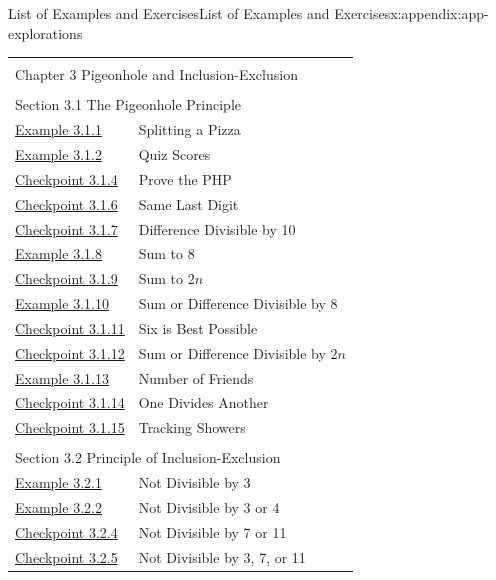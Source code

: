 \documentclass[oneside,10pt,]{book}
\numberwithin{equation}{section}
\begin{document}
\begin{appendixptx}{List of Examples and Exercises}{}{List of Examples and Exercises}{}{}{x:appendix:app-explorations}
\begin{longtable}[l]{ll}
\multicolumn{2}{l}{\null}\\[1.5ex] \multicolumn{2}{l}{\large Chapter 3 Pigeonhole and Inclusion-Exclusion}\\[0.5ex]
\multicolumn{2}{l}{\null}\\[1.5ex] \multicolumn{2}{l}{\large Section 3.1 The Pigeonhole Principle}\\[0.5ex]
\hyperref[x:example:eg-php-pizza]{Example 3.1.1}& Splitting a Pizza\\
\hyperref[x:example:eg-php-quiz-scores]{Example 3.1.2}& Quiz Scores\\
\hyperref[x:exercise:ex-php-proof]{Checkpoint 3.1.4}& Prove the PHP\\
\hyperref[x:exercise:ex-php-last-digit]{Checkpoint 3.1.6}& Same Last Digit\\
\hyperref[x:exercise:ex-php-difference-divisible]{Checkpoint 3.1.7}& Difference Divisible by 10\\
\hyperref[x:example:eg-php-sum-to-8]{Example 3.1.8}& Sum to 8\\
\hyperref[x:exercise:ex-php-sum-to-2n]{Checkpoint 3.1.9}& Sum to \(2n\)\\
\hyperref[x:example:eg-php-sum-diff-8]{Example 3.1.10}& Sum or Difference Divisible by 8\\
\hyperref[x:exercise:ex-php-sum-diff-8-best]{Checkpoint 3.1.11}& Six is Best Possible\\
\hyperref[x:exercise:ex-php-sum-diff-2n]{Checkpoint 3.1.12}& Sum or Difference Divisible by \(2n\)\\
\hyperref[x:example:ex-php-friends]{Example 3.1.13}& Number of Friends\\
\hyperref[x:exercise:ex-php-divides]{Checkpoint 3.1.14}& One Divides Another\\
\hyperref[x:exercise:ex-php-shower]{Checkpoint 3.1.15}& Tracking Showers\\
\multicolumn{2}{l}{\null}\\[1.5ex] \multicolumn{2}{l}{\large Section 3.2 Principle of Inclusion-Exclusion}\\[0.5ex]
\hyperref[x:example:eg-pie-divisible-3]{Example 3.2.1}& Not Divisible by 3\\
\hyperref[x:example:eg-pie-divisible-3-4]{Example 3.2.2}& Not Divisible by 3 or 4\\
\hyperref[x:exercise:ex-pie-divisible-7-11]{Checkpoint 3.2.4}& Not Divisible by 7 or 11\\
\hyperref[x:exercise:ex-pie-divisible-3-7-11]{Checkpoint 3.2.5}& Not Divisible by 3, 7, or 11\\

\end{longtable}
\end{appendixptx}
\end{document}
